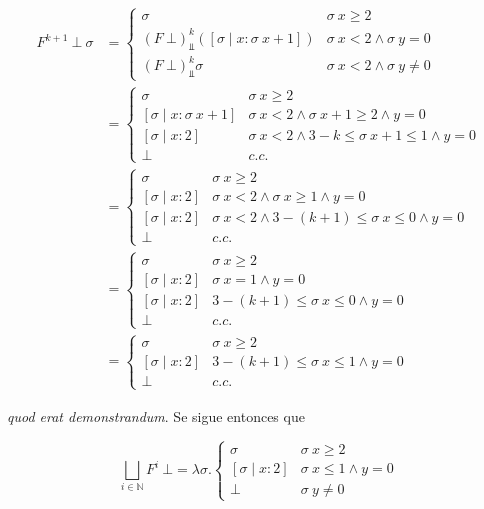 \documentclass[a4paper, 12pt]{article}
\begin{document}
\begin{align*}
  F^{k+1} ~ \bot ~ \sigma 
  &= \begin{cases}
    \sigma & \sigma ~ x \geq 2 \\ 
    (F ~ \bot )^k_{\Bot} \left( [\sigma \mid x : \sigma ~ x + 1] \right)  & \sigma ~ x < 2
    \land \sigma ~ y = 0 \\
    (F ~ \bot )^k_{\Bot} \sigma  & \sigma ~ x < 2 \land \sigma ~ y \neq 0
  \end{cases} \\ 
  &=\begin{cases}
    \sigma & \sigma ~ x \geq 2 \\ 
    [\sigma \mid x : \sigma ~ x + 1 ] & \sigma ~ x < 2\land \sigma ~ x + 1 \geq
    2 \land  y = 0 \\
    [\sigma \mid x : 2] & \sigma ~ x < 2 \land  3 - k \leq \sigma ~ x + 1 \leq 1 \land  y = 0 \\ 
    \bot & c.c.
  \end{cases} \\ 
  &=\begin{cases}
    \sigma & \sigma ~ x \geq 2 \\ 
    [\sigma \mid x : 2] & \sigma ~ x < 2 \land  \sigma ~ x \geq 1 \land  y  =0
    \\ 
    [\sigma \mid x : 2] & \sigma ~ x < 2 \land 3 - (k+1) \leq \sigma ~ x \leq 0
    \land  y  = 0 \\ 
    \bot  &c.c.
  \end{cases}\\
  &=\begin{cases}
    \sigma & \sigma ~ x \geq 2 \\ 
    [\sigma \mid x : 2] & \sigma ~ x = 1\land   y  =0
    \\ 
    [\sigma \mid x : 2] & 3 - (k+1) \leq \sigma ~ x \leq 0
    \land  y  = 0 \\ 
    \bot  &c.c.
  \end{cases}\\
  &=\begin{cases}
    \sigma & \sigma ~ x \geq 2 \\ 
    [\sigma \mid x : 2] & 3 - (k+1) \leq \sigma ~ x \leq 1
    \land  y  = 0 \\ 
    \bot  &c.c.
  \end{cases}
\end{align*}

\textit{quod erat demonstrandum}. Se sigue entonces que 

\begin{equation*}
  \bigsqcup_{i \in \mathbb{N}} F^{i} ~ \bot = \lambda \sigma . \begin{cases}
    \sigma & \sigma ~ x \geq 2 \\ 
    [\sigma \mid x : 2] &\sigma ~ x \leq 1 \land  y = 0 \\ 
    \bot & \sigma ~ y \neq 0
  \end{cases}
\end{equation*}
\end{document}
